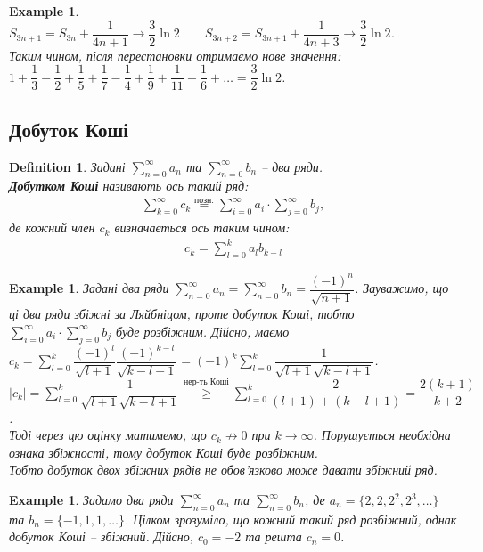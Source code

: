 \documentclass[a4paper, 10pt]{article}
\theoremstyle{theoremdd}
\theoremstyle{theoremdd}
\theoremstyle{theoremdd}
\newtheorem{definition}[theorem]{Definition}
\theoremstyle{theoremdd}
\theoremstyle{theoremdd}
\newtheorem{example}[theorem]{Example}
\theoremstyle{theoremdd}
\theoremstyle{theoremdd}
\theoremstyle{theoremdd}
\theoremstyle{theoremdd}
\begin{document}
\begin{example}
$S_{3n+1} = S_{3n} + \dfrac{1}{4n+1} \to \dfrac{3}{2} \ln 2 \qquad S_{3n+2} = S_{3n+1} + \dfrac{1}{4n+3} \to \dfrac{3}{2} \ln 2$.\\
Таким чином, після перестановки отримаємо нове значення:\\
$1 + \dfrac{1}{3} - \dfrac{1}{2} + \dfrac{1}{5} + \dfrac{1}{7} - \dfrac{1}{4} + \dfrac{1}{9} + \dfrac{1}{11} - \dfrac{1}{6} + \dots = \dfrac{3}{2} \ln 2$.
\end{example}

\subsection{Добуток Коші}
\begin{definition}
Задані $\displaystyle\sum_{n=0}^\infty a_n$ та $\displaystyle\sum_{n=0}^\infty b_n$ -- два ряди.\\
\textbf{Добутком Коші} називають ось такий ряд:
\begin{align*}
\sum_{k=0}^\infty c_k \overset{\text{позн.}}{=} \sum_{i=0}^\infty a_i \cdot \sum_{j=0}^\infty b_j,
\end{align*}
де кожний член $c_k$ визначається ось таким чином:
\begin{align*}
c_k = \sum_{l=0}^k a_l b_{k-l}
\end{align*}
\end{definition}

\begin{example}
Задані два ряди $\displaystyle\sum_{n=0}^\infty a_n = \sum_{n=0}^\infty b_n = \dfrac{(-1)^n}{\sqrt{n+1}}$. Зауважимо, що ці два ряди збіжні за Ляйбніцом, проте добуток Коші, тобто $\displaystyle \sum_{i=0}^\infty a_i \cdot \sum_{j=0}^\infty b_j$ буде розбіжним. Дійсно, маємо\\
$c_k = \displaystyle\sum_{l=0}^k \dfrac{(-1)^l}{\sqrt{l+1}} \dfrac{(-1)^{k-l}}{\sqrt{k-l+1}} = (-1)^k \sum_{l=0}^k \dfrac{1}{\sqrt{l+1} \sqrt{k-l+1}}$.\\
$|c_k| = \displaystyle\sum_{l=0}^k \dfrac{1}{\sqrt{l+1} \sqrt{k-l+1}} \overset{\text{нер-ть Коші}}{\geq} \sum_{l=0}^k \dfrac{2}{(l+1)+(k-l+1)} = \dfrac{2(k+1)}{k+2}$.\\
Тоді через цю оцінку матимемо, що $c_k \not\to 0$ при $k \to \infty$. Порушується необхідна ознака збіжності, тому добуток Коші буде розбіжним. \\
Тобто добуток двох збіжних рядів не обов'язково може давати збіжний ряд.
\end{example}

\begin{example}
Задамо два ряди $\displaystyle\sum_{n=0}^\infty a_n$ та $\displaystyle\sum_{n=0}^\infty b_n$, де $a_n = \{2,2,2^2,2^3,\dots\}$ та $b_n = \{-1,1,1,\dots\}$. Цілком зрозуміло, що кожний такий ряд розбіжний, однак добуток Коші -- збіжний. Дійсно, $c_0 = -2$ та решта $c_n = 0$.
\end{example}
\end{document}
